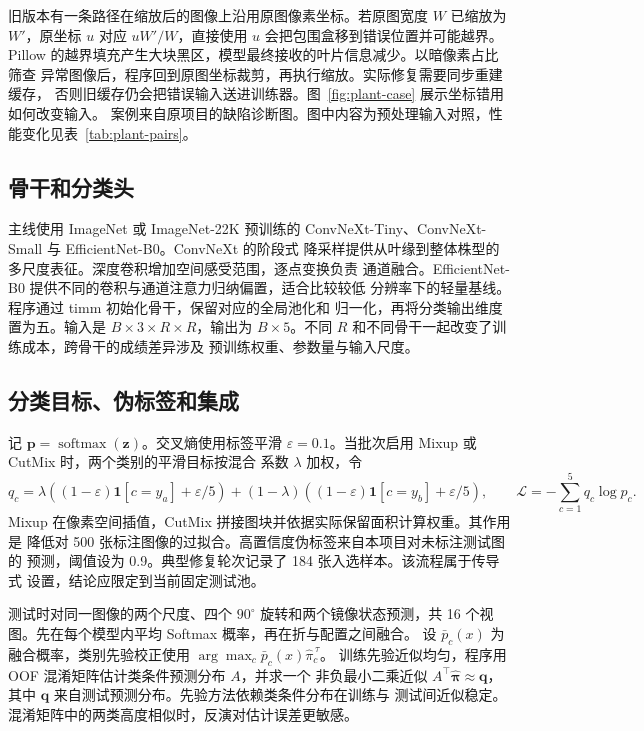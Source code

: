 旧版本有一条路径在缩放后的图像上沿用原图像素坐标。若原图宽度 $W$ 已缩放为
$W'$，原坐标 $u$ 对应 $uW'/W$，直接使用 $u$ 会把包围盒移到错误位置并可能越界。
Pillow 的越界填充产生大块黑区，模型最终接收的叶片信息减少。以暗像素占比筛查
异常图像后，程序回到原图坐标裁剪，再执行缩放。实际修复需要同步重建缓存，
否则旧缓存仍会把错误输入送进训练器。\ifLocalReport 图~\ref{fig:plant-case} 展示坐标错用如何改变输入。\fi
{}
{案例来自原项目的缺陷诊断图。图中内容为预处理输入对照，性能变化见表~\ref{tab:plant-pairs}。}

\subsection{骨干和分类头}
主线使用 ImageNet 或 ImageNet-22K 预训练的 ConvNeXt-Tiny、ConvNeXt-Small 与
EfficientNet-B0\citep{liu2022convnext,tan2019efficientnet}。ConvNeXt 的阶段式
降采样提供从叶缘到整体株型的多尺度表征。深度卷积增加空间感受范围，逐点变换负责
通道融合。EfficientNet-B0 提供不同的卷积与通道注意力归纳偏置，适合比较较低
分辨率下的轻量基线。程序通过 timm 初始化骨干，保留对应的全局池化和
归一化，再将分类输出维度置为五。输入是 $B\times3\times R\times R$，输出为
$B\times5$。不同 $R$ 和不同骨干一起改变了训练成本，跨骨干的成绩差异涉及
预训练权重、参数量与输入尺度。

\subsection{分类目标、伪标签和集成}
记 $\mathbf p=\operatorname{softmax}(\mathbf z)$。交叉熵使用标签平滑
$\varepsilon=0.1$。当批次启用 Mixup 或 CutMix 时，两个类别的平滑目标按混合
系数 $\lambda$ 加权，令
\[
 q_c=\lambda( (1-\varepsilon)\mathbf 1[c=y_a]+\varepsilon/5)
      +(1-\lambda)((1-\varepsilon)\mathbf 1[c=y_b]+\varepsilon/5),
 \qquad \mathcal L=-\sum_{c=1}^5q_c\log p_c .
\]
Mixup 在像素空间插值，CutMix 拼接图块并依据实际保留面积计算权重。其作用是
降低对 500 张标注图像的过拟合。高置信度伪标签来自本项目对未标注测试图的
预测，阈值设为 0.9。典型修复轮次记录了 184 张入选样本。该流程属于传导式
设置，结论应限定到当前固定测试池。

测试时对同一图像的两个尺度、四个 $90^\circ$ 旋转和两个镜像状态预测，共
16 个视图。先在每个模型内平均 Softmax 概率，再在折与配置之间融合。
设 $\bar p_c(x)$ 为融合概率，类别先验校正使用
$\arg\max_c \bar p_c(x)\hat\pi_c^{\,\tau}$。
训练先验近似均匀，程序用 OOF 混淆矩阵估计类条件预测分布 $A$，并求一个
非负最小二乘近似 $A^\top\hat{\boldsymbol{\pi}}\approx\boldsymbol q$，
其中 $\boldsymbol q$ 来自测试预测分布。先验方法依赖类条件分布在训练与
测试间近似稳定。混淆矩阵中的两类高度相似时，反演对估计误差更敏感。

